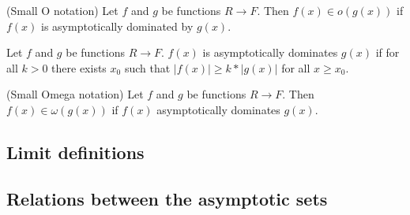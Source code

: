 \begin{definition}(Small O notation)
\leanok
    Let $f$ and $g$ be functions $R \to F$. Then $f(x) \in o(g(x))$ if $f(x)$ 
    is asymptotically dominated by $g(x)$.
\end{definition}

\begin{definition}
\leanok
    Let $f$ and $g$ be functions $R \to F$. $f(x)$ is asymptotically dominates $g(x)$ if 
    for all $k > 0$ there exists $x_0$ such that $|f(x)| \ge k*|g(x)|$ for all $x \ge x_0$.
\end{definition}

\begin{definition}(Small Omega notation)
\leanok
    Let $f$ and $g$ be functions $R \to F$. Then $f(x) \in \omega(g(x))$ if $f(x)$ 
    asymptotically dominates $g(x)$.
\end{definition}


\subsection{Limit definitions}

\subsection{Relations between the asymptotic sets}



